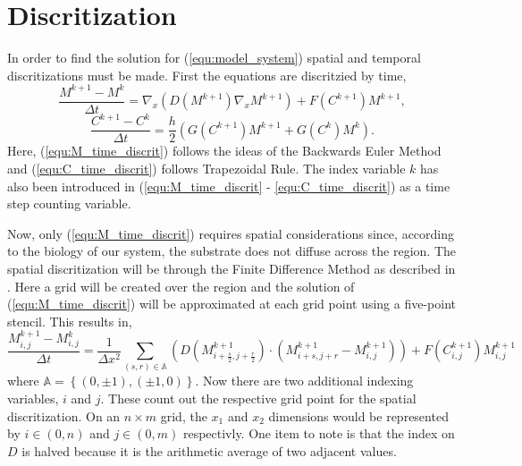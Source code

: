 \section{Discritization}

In order to find the solution for (\ref{equ:model_system}) spatial and temporal discritizations must be made.
First the equations are discritzied by time, 
\begin{equation} \label{equ:M_time_discrit}
  \frac{M^{k+1} - M^{k}}{\Delta t} = \nabla_x (D(M^{k+1}) \nabla_x M^{k+1}) + F(C^{k+1}) M^{k+1},
\end{equation}
\begin{equation} \label{equ:C_time_discrit}
  \frac{C^{k+1} - C^{k}}{\Delta t} = \frac{h}{2} ( G(C^{k+1}) M^{k+1} + G(C^{k}) M^{k} ).
\end{equation}
Here, (\ref{equ:M_time_discrit}) follows the ideas of the Backwards Euler Method and (\ref{equ:C_time_discrit}) follows Trapezoidal Rule. 
The index variable $k$ has also been introduced in (\ref{equ:M_time_discrit} - \ref{equ:C_time_discrit}) as a time step counting variable.

Now, only (\ref{equ:M_time_discrit}) requires spatial considerations since, according to the biology of our system, the substrate does not diffuse across the region.
The spatial discritization will be through the Finite Difference Method as described in \cite{saad2003iterativeMethod}.
Here a grid will be created over the region and the solution of (\ref{equ:M_time_discrit}) will be approximated at each grid point using a five-point stencil. 
This results in, 
\begin{equation} \label{equ:M_space_discrit}
  \frac{M^{k+1}_{i,j} - M^{k}_{i,j}}{\Delta t} = 
    \frac{1}{\Delta x^2} \sum_{(s,r) \in \mathbb{A}} \left( D(M^{k+1}_{i+\frac{s}{2}, j+\frac{r}{2}}) \cdot
    ( M^{k+1}_{i+s, j+r} - M^{k+1}_{i,j}) \right) + F(C^{k+1}_{i,j}) M^{k+1}_{i,j}
\end{equation}
where $\mathbb{A} = \left\{ (0, \pm1), (\pm1, 0) \right\}$.
Now there are two additional indexing variables, $i$ and $j$.
These count out the respective grid point for the spatial discritization.
On an $n \times m$ grid, the $x_1$ and $x_2$ dimensions would be represented by $i \in (0, n)$ and $j \in (0,m)$ respectivly.
One item to note is that the index on $D$ is halved because it is the arithmetic average of two adjacent values.


